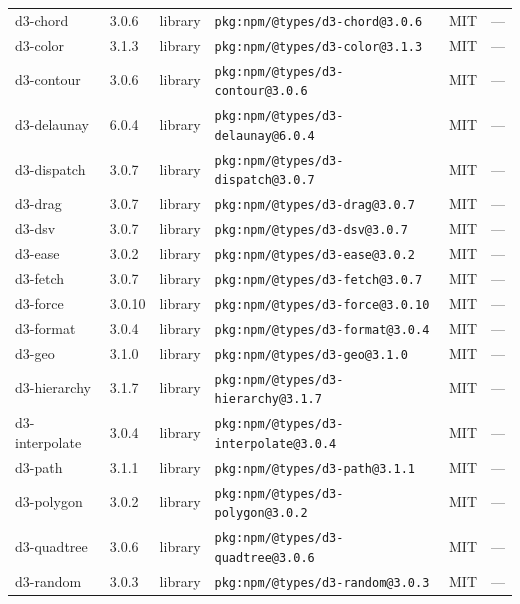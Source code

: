 \documentclass[11pt,a4paper]{article}
\begin{document}
\begin{longtable}{|p{4cm}|p{2cm}|p{1.6cm}|p{5cm}|p{1.5cm}|p{3.5cm}|}
\raggedright d3-chord & 3.0.6 & library & \small\texttt{pkg:npm/@types/d3-chord@3.0.6} & MIT & \small — \\
\raggedright d3-color & 3.1.3 & library & \small\texttt{pkg:npm/@types/d3-color@3.1.3} & MIT & \small — \\
\raggedright d3-contour & 3.0.6 & library & \small\texttt{pkg:npm/@types/d3-contour@3.0.6} & MIT & \small — \\
\raggedright d3-delaunay & 6.0.4 & library & \small\texttt{pkg:npm/@types/d3-delaunay@6.0.4} & MIT & \small — \\
\raggedright d3-dispatch & 3.0.7 & library & \small\texttt{pkg:npm/@types/d3-dispatch@3.0.7} & MIT & \small — \\
\raggedright d3-drag & 3.0.7 & library & \small\texttt{pkg:npm/@types/d3-drag@3.0.7} & MIT & \small — \\
\raggedright d3-dsv & 3.0.7 & library & \small\texttt{pkg:npm/@types/d3-dsv@3.0.7} & MIT & \small — \\
\raggedright d3-ease & 3.0.2 & library & \small\texttt{pkg:npm/@types/d3-ease@3.0.2} & MIT & \small — \\
\raggedright d3-fetch & 3.0.7 & library & \small\texttt{pkg:npm/@types/d3-fetch@3.0.7} & MIT & \small — \\
\raggedright d3-force & 3.0.10 & library & \small\texttt{pkg:npm/@types/d3-force@3.0.10} & MIT & \small — \\
\raggedright d3-format & 3.0.4 & library & \small\texttt{pkg:npm/@types/d3-format@3.0.4} & MIT & \small — \\
\raggedright d3-geo & 3.1.0 & library & \small\texttt{pkg:npm/@types/d3-geo@3.1.0} & MIT & \small — \\
\raggedright d3-hierarchy & 3.1.7 & library & \small\texttt{pkg:npm/@types/d3-hierarchy@3.1.7} & MIT & \small — \\
\raggedright d3-interpolate & 3.0.4 & library & \small\texttt{pkg:npm/@types/d3-interpolate@3.0.4} & MIT & \small — \\
\raggedright d3-path & 3.1.1 & library & \small\texttt{pkg:npm/@types/d3-path@3.1.1} & MIT & \small — \\
\raggedright d3-polygon & 3.0.2 & library & \small\texttt{pkg:npm/@types/d3-polygon@3.0.2} & MIT & \small — \\
\raggedright d3-quadtree & 3.0.6 & library & \small\texttt{pkg:npm/@types/d3-quadtree@3.0.6} & MIT & \small — \\
\raggedright d3-random & 3.0.3 & library & \small\texttt{pkg:npm/@types/d3-random@3.0.3} & MIT & \small — \\

\end{longtable}
\end{document}
